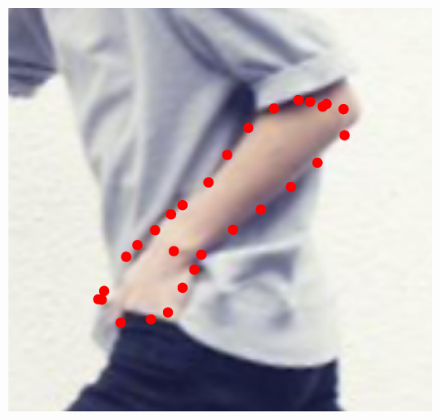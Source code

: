 \begin{figure}[!t]
    \includegraphics[height=\ofh]{resources/Annotation_Correction/Fittings/33.eps}
    \hfill

\end{figure}
